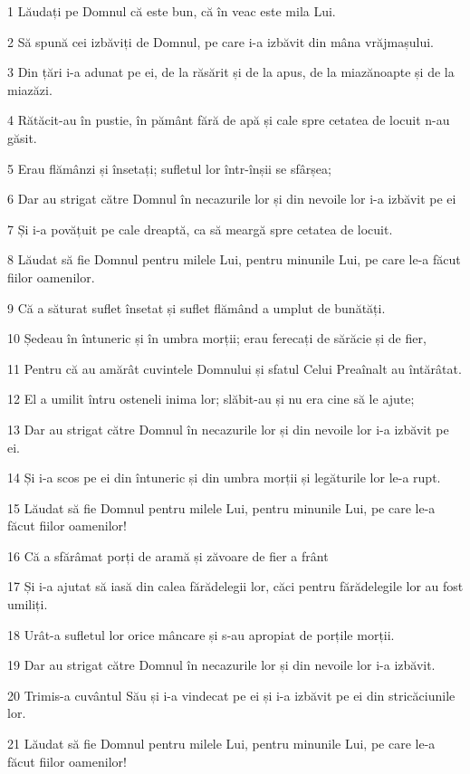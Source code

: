\par 1 Lăudați pe Domnul că este bun, că în veac este mila Lui.
\par 2 Să spună cei izbăviți de Domnul, pe care i-a izbăvit din mâna vrăjmașului.
\par 3 Din țări i-a adunat pe ei, de la răsărit și de la apus, de la miazănoapte și de la miazăzi.
\par 4 Rătăcit-au în pustie, în pământ fără de apă și cale spre cetatea de locuit n-au găsit.
\par 5 Erau flămânzi și însetați; sufletul lor într-înșii se sfârșea;
\par 6 Dar au strigat către Domnul în necazurile lor și din nevoile lor i-a izbăvit pe ei
\par 7 Și i-a povățuit pe cale dreaptă, ca să meargă spre cetatea de locuit.
\par 8 Lăudat să fie Domnul pentru milele Lui, pentru minunile Lui, pe care le-a făcut fiilor oamenilor.
\par 9 Că a săturat suflet însetat și suflet flămând a umplut de bunătăți.
\par 10 Ședeau în întuneric și în umbra morții; erau ferecați de sărăcie și de fier,
\par 11 Pentru că au amărât cuvintele Domnului și sfatul Celui Preaînalt au întărâtat.
\par 12 El a umilit întru osteneli inima lor; slăbit-au și nu era cine să le ajute;
\par 13 Dar au strigat către Domnul în necazurile lor și din nevoile lor i-a izbăvit pe ei.
\par 14 Și i-a scos pe ei din întuneric și din umbra morții și legăturile lor le-a rupt.
\par 15 Lăudat să fie Domnul pentru milele Lui, pentru minunile Lui, pe care le-a făcut fiilor oamenilor!
\par 16 Că a sfărâmat porți de aramă și zăvoare de fier a frânt
\par 17 Și i-a ajutat să iasă din calea fărădelegii lor, căci pentru fărădelegile lor au fost umiliți.
\par 18 Urât-a sufletul lor orice mâncare și s-au apropiat de porțile morții.
\par 19 Dar au strigat către Domnul în necazurile lor și din nevoile lor i-a izbăvit.
\par 20 Trimis-a cuvântul Său și i-a vindecat pe ei și i-a izbăvit pe ei din stricăciunile lor.
\par 21 Lăudat să fie Domnul pentru milele Lui, pentru minunile Lui, pe care le-a făcut fiilor oamenilor!
